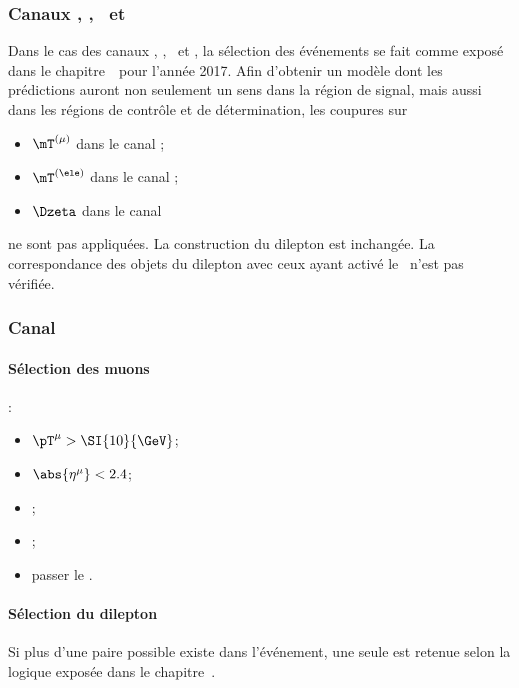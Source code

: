 \subsubsection{Canaux \tauh\tauh, \mu\tauh, \ele\tauh\ et \ele\mu}
Dans le cas des canaux
\tauh\tauh, \mu\tauh, \ele\tauh\ et \ele\mu,
la sélection des événements se fait comme exposé dans le chapitre~\ pour l'année 2017.
Afin d'obtenir un modèle dont les prédictions auront non seulement un sens dans la région de signal, mais aussi dans les régions de contrôle et de détermination, les coupures sur
\begin{itemize}
\item $\mT^{(\mu)}$ dans le canal \mu\tauh;
\item $\mT^{(\ele)}$ dans le canal \ele\tauh;
\item $\Dzeta$ dans le canal \ele\mu
\end{itemize}
ne sont pas appliquées.
La construction du dilepton est inchangée.
La correspondance des objets du dilepton avec ceux ayant activé le \HLTpath\ n'est pas vérifiée.
\renewcommand{\IfMoreOnePair}{Si plus d'une paire possible existe dans l'événement, une seule est retenue selon la logique exposée dans le chapitre~\refChHTT.}
\subsubsection{Canal \mu\mu}
\paragraph{Sélection des muons}
:
\begin{itemize}
    \item $\pT^{\mu} > \SI{10}{\GeV}$;
    \item $\abs{\eta^{\mu}} < 2.4$;
    \item \Leptondzdxy;
    \item {};
    \item passer le \MediumMuonID.
\end{itemize}
\paragraph{Sélection du dilepton}
\AtLeastOneOSPair{\mu\mu}
\IfMoreOnePair
